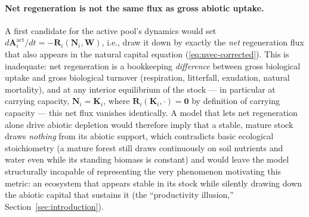 \documentclass[twocolumn,10pt]{article}
\begin{document}
\paragraph{Net regeneration is not the same flux as gross abiotic uptake.} A first candidate for the active pool's dynamics would set $d\mathbf{A}^{\text{act}}_i/dt=-\mathbf{R}_i(\mathbf{N}_i,\mathbf{W})$, i.e., draw it down by exactly the \emph{net} regeneration flux that also appears in the natural capital equation (\ref{eq:nvec-corrected}). This is inadequate: net regeneration is a bookkeeping \emph{difference} between gross biological uptake and gross biological turnover (respiration, litterfall, exudation, natural mortality), and at any interior equilibrium of the stock — in particular at carrying capacity, $\mathbf N_i=\mathbf K_i$, where $\mathbf R_i(\mathbf K_i,\cdot)=\mathbf 0$ by definition of carrying capacity — this net flux vanishes identically. A model that lets net regeneration alone drive abiotic depletion would therefore imply that a stable, mature stock draws \emph{nothing} from its abiotic support, which contradicts basic ecological stoichiometry (a mature forest still draws continuously on soil nutrients and water even while its standing biomass is constant) and would leave the model structurally incapable of representing the very phenomenon motivating this metric: an ecosystem that appears stable in its stock while silently drawing down the abiotic capital that sustains it (the ``productivity illusion,'' Section~\ref{sec:introduction}).
\end{document}
